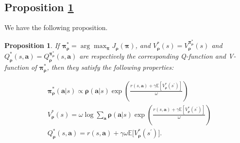 \documentclass{article}
\newtheorem{proposition}{Proposition}
\begin{document}
	\subsection{Proposition \ref{theorem1}}
	\label{sec:app-them1}
	 We have the following proposition.
    \begin{proposition} \label{theorem1}
	If ${\bm{\pi}}^*_{\bm{\rho}} = \arg \max_{\bm{\pi}} J_{\bm{\rho}}({\bm{\pi}})$, and $V_{\bm{\rho}}^*(s) = V_{\bm{\rho}}^{{\bm{\pi}}^*_{\bm{\rho}}}(s)$ and $Q_{\bm{\rho}}^{*}(s,\bm{a}) = Q_{\bm{\rho}}^{{\bm{\pi}}^*_{\bm{\rho}}}(s,\bm{a})$ are respectively the corresponding Q-function and V-function of ${\bm{\pi}}^*_{\bm{\rho}}$, then they satisfy the following properties:
	\iffalse
	\begin{align}
		& {\bm{\pi}}^*_{\bm{\rho}}(\bm{a}|s) \propto {\bm{\rho}}(\bm{a}|s) \exp\left( \left(r(s,\bm{a}) + \gamma \mathbb{E}_{s^\prime \sim P(\cdot|s,\bm{a})}\left[ V^*_{\bm{\rho}}(s^{\prime})\right]\right) / \omega   \right) \label{opt-policy} \\
		& V^*_{\bm{\rho}}(s) = \omega \log \sum_{\bm{a}} {\bm{\rho}}(\bm{a}|s) \exp\left( \left(r(s,\bm{a}) + \gamma \mathbb{E}_{s^\prime \sim P(\cdot|s,\bm{a})}\left[ V^*_{\bm{\rho}}(s^{\prime})\right]\right) / \omega \right) \\
		& Q_{\bm{\rho}}^*(s,\bm{a})  =  r(s,\bm{a})  + \gamma \omega \mathbb{E}_{s^\prime \sim P(\cdot|s,\bm{a})}\Big[ \log \sum_{\bm{a^{\prime}}} {\bm{\rho}}(\bm{a}|s) \exp \left( Q^*_{\bm{\rho}}(s^{\prime},\bm{a}^{\prime}) / \omega \right)  \Big].
	\end{align}
	\fi
	\begin{align}
		& {\bm{\pi}}^*_{\bm{\rho}}(\bm{a}|s) \propto {\bm{\rho}}(\bm{a}|s) \exp\left( \frac{r(s,\bm{a}) + \gamma \mathbb{E}\left[ V^*_{\bm{\rho}}(s^{\prime})\right]}{\omega } \right) \label{opt-policy} \\
		& V^*_{\bm{\rho}}(s) = \omega \log \sum_{\bm{a}} {\bm{\rho}}(\bm{a}|s) \exp\left( \frac{ r(s,\bm{a}) + \gamma \mathbb{E}\left[ V^*_{\bm{\rho}}(s^{\prime})\right] }{\omega}  \right) \\
		& Q_{\bm{\rho}}^*(s,\bm{a})  =  r(s,\bm{a})  + \gamma \omega \mathbb{E}\Big[V^*_{\bm{\rho}}(s^{\prime})   \Big].
	\end{align}
    \end{proposition}
	
\end{document}

